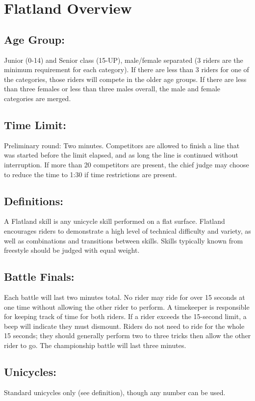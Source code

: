 \section{Flatland Overview}

\subsection{Age Group:}
Junior (0-14) and Senior class (15-UP), male/female separated (3 riders are the minimum requirement for each category).
If there are less than 3 riders for one of the categories, those riders will compete in the older age groups.
If there are less than three females or less than three males overall, the male and female categories are merged.

\subsection{Time Limit:}
Preliminary round: Two minutes.
Competitors are allowed to finish a line that was started before the limit elapsed, and as long the line is continued without interruption.
If more than 20 competitors are present, the chief judge may choose to reduce the time to 1:30 if time restrictions are present.

\subsection{Definitions:}
A Flatland skill is any unicycle skill performed on a flat surface.
Flatland encourages riders to demonstrate a high level of technical difficulty and variety, as well as combinations and transitions between skills.
Skills typically known from freestyle should be judged with equal weight.

\subsection{Battle Finals:}
Each battle will last two minutes total.
No rider may ride for over 15 seconds at one time without allowing the other rider to perform.
A timekeeper is responsible for keeping track of time for both riders.
If a rider exceeds the 15-second limit, a beep will indicate they must dismount.
Riders do not need to ride for the whole 15 seconds; they should generally perform two to three tricks then allow the other rider to go.
The championship battle will last three minutes.

\subsection{Unicycles:}
Standard unicycles only (see definition), though any number can be used.

